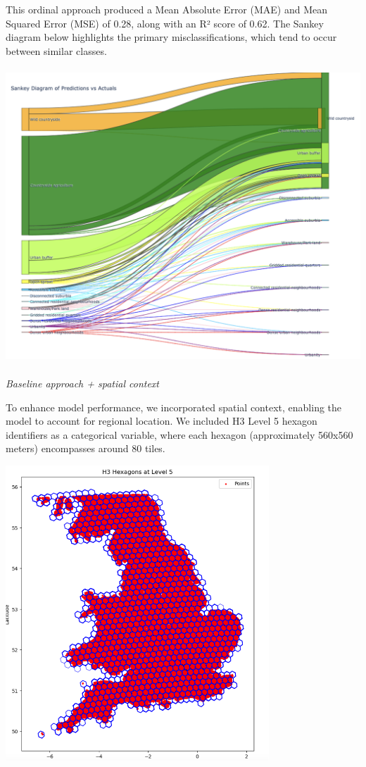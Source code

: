 \documentclass[
  letterpaper,
  DIV=11,
  numbers=noendperiod]{scrartcl}
\begin{document}
This ordinal approach produced a Mean Absolute Error (MAE) and Mean
Squared Error (MSE) of 0.28, along with an R² score of 0.62. The Sankey
diagram below highlights the primary misclassifications, which tend to
occur between similar classes.

\begin{center}
\includegraphics[width=\textwidth,height=4.375in]{../figures/algo_design/sankey.png}
\end{center}

\emph{Baseline approach + spatial context}

To enhance model performance, we incorporated spatial context, enabling
the model to account for regional location. We included H3 Level 5
hexagon identifiers as a categorical variable, where each hexagon
(approximately 560x560 meters) encompasses around 80 tiles.

\begin{center}
\includegraphics[width=\textwidth,height=4.375in]{../figures/algo_design/hex_level5.png}
\end{center}
\end{document}

